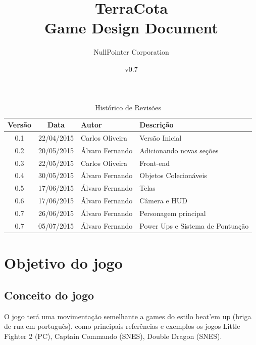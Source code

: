 \documentclass[12pt]{article}
\begin{document}
\title{TerraCota\\Game Design Document}
\author{NullPointer Corporation}
\date{v0.7}
\maketitle

\newpage

\begin{table}[h]
  \centering
  \begin{tabular}{ccll}
    \toprule
    \textbf{Versão} & \textbf{Data} & \textbf{Autor} & \textbf{Descrição} \\
    \midrule
    0.1 & 22/04/2015 & Carlos Oliveira  & Versão Inicial \\
    \rowcolor[gray]{0.9}
    0.2 & 20/05/2015 & Álvaro Fernando & Adicionando novas seções \\
    0.3 & 22/05/2015 & Carlos Oliveira & Front-end \\
    \rowcolor[gray]{0.9}
    0.4 & 30/05/2015 & Álvaro Fernando & Objetos Colecionáveis \\
    0.5 & 17/06/2015 & Álvaro Fernando & Telas \\
    \rowcolor[gray]{0.9}
    0.6 & 17/06/2015 & Álvaro Fernando & Câmera e HUD \\
    0.7 & 26/06/2015 & Álvaro Fernando & Personagem principal \\
    \rowcolor[gray]{0.9}
    0.7 & 05/07/2015 & Álvaro Fernando & Power Ups e Sistema de Pontuação \\
    \bottomrule
  \end{tabular}
  \caption{Histórico de Revisões}
\end{table}

\newpage

\tableofcontents

\newpage

\listoffigures

\newpage
\section{Objetivo do jogo}

\subsection{Conceito do jogo}
O jogo terá uma movimentação semelhante a games do estilo beat'em up (briga de
rua em português), como principais referências e exemplos os jogos Little
Fighter 2 (PC), Captain Commando (SNES), Double Dragon (SNES).
\end{document}
